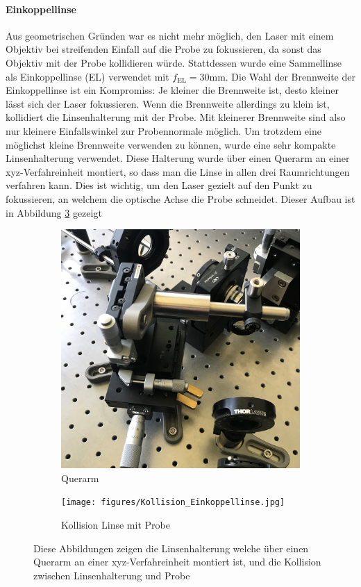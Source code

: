 \documentclass[titlepage]{article}
\begin{document}
	\paragraph{Einkoppellinse}
	Aus geometrischen Gründen war es nicht mehr möglich, den Laser mit einem Objektiv bei streifenden Einfall auf die Probe zu fokussieren, da sonst das Objektiv mit der Probe kollidieren würde. Stattdessen wurde eine Sammellinse als Einkoppellinse (EL) verwendet mit $f_{\mathrm{EL}}= 30\mathrm{mm}$. Die Wahl der Brennweite der Einkoppellinse ist ein Kompromiss: Je kleiner die Brennweite ist, desto kleiner lässt sich der Laser fokussieren. Wenn die Brennweite allerdings zu klein ist, kollidiert die Linsenhalterung mit der Probe. Mit kleinerer Brennweite sind also nur kleinere Einfallswinkel zur Probennormale möglich. Um trotzdem eine möglichst kleine Brennweite verwenden zu können, wurde eine sehr kompakte Linsenhalterung verwendet. Diese Halterung wurde über einen Querarm an einer xyz-Verfahreinheit montiert, so dass man die Linse in allen drei Raumrichtungen verfahren kann. Dies ist wichtig, um den Laser gezielt auf den Punkt zu fokussieren, an welchem die optische Achse die Probe schneidet. Dieser Aufbau ist in Abbildung \ref{fig:linsenhalterung} gezeigt
	\begin{figure}
		\centering
		\begin{subfigure}[b]{0.4\textwidth}
			\centering
			\includegraphics[width=\textwidth]{figures/Einkoppellinse.jpg}
			\caption{Querarm}
			\label{fig:querarm}
		\end{subfigure}
		\hfill
		\begin{subfigure}[b]{0.4\textwidth}
			\centering
			\texttt{[image: figures/Kollision\_Einkoppellinse.jpg]}
			\caption{Kollision Linse mit Probe}
			\label{fig:kollision}
		\end{subfigure}
		\caption{Diese Abbildungen zeigen die Linsenhalterung welche über einen Querarm an einer xyz-Verfahreinheit montiert ist, und die Kollision zwischen Linsenhalterung und Probe}
		\label{fig:linsenhalterung}
	\end{figure}
	
\end{document}
